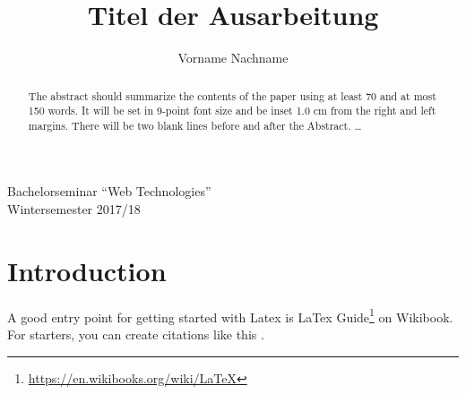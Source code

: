 \documentclass{llncs}
\begin{document}
\title{Titel der Ausarbeitung}
\author{Vorname Nachname}

\maketitle 
\begin{center}
Bachelorseminar ``Web Technologies'' \\
Wintersemester 2017/18
\end{center}

\begin{abstract}
The abstract should summarize the contents of the paper
using at least 70 and at most 150 words. It will be set in 9-point
font size and be inset 1.0 cm from the right and left margins.
There will be two blank lines before and after the Abstract. \dots
{}
\end{abstract}

\section{Introduction}

A good entry point for getting started with Latex is LaTex Guide\footnote{\url{https://en.wikibooks.org/wiki/LaTeX}} on Wikibook. For starters, you can create citations like this \cite{berners2001semantic}.



\end{document}

